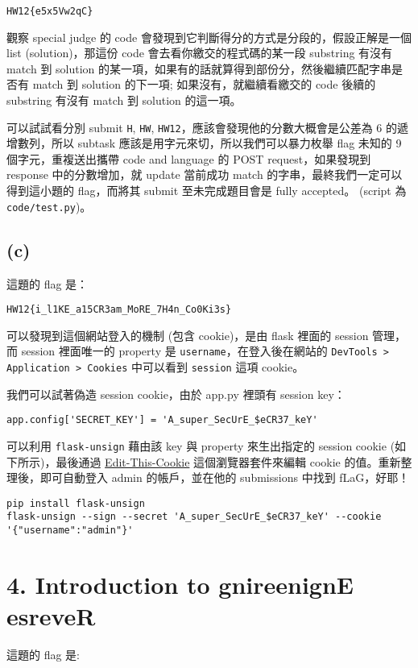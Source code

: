 \documentclass[12pt]{article}
\begin{document}
{\centering\verb|HW12{e5x5Vw2qC}|\par}

觀察 special judge 的 code 會發現到它判斷得分的方式是分段的，假設正解是一個 list (solution)，那這份 code 會去看你繳交的程式碼的某一段 substring 有沒有 match 到 solution 的某一項，如果有的話就算得到部份分，然後繼續匹配字串是否有 match 到 solution 的下一項; 如果沒有，就繼續看繳交的 code 後續的 substring 有沒有 match 到 solution 的這一項。

可以試試看分別 submit \verb|H|, \verb|HW|, \verb|HW12|，應該會發現他的分數大概會是公差為 6 的遞增數列，所以 subtask 應該是用字元來切，所以我們可以暴力枚舉 flag 未知的 9 個字元，重複送出攜帶 code and language 的 POST request，如果發現到 response 中的分數增加，就 update 當前成功 match 的字串，最終我們一定可以得到這小題的 flag，而將其 submit 至未完成題目會是 fully accepted。 (script 為 \verb|code/test.py|)。

\subsection*{(c)}
這題的 flag 是：

{\centering\verb|HW12{i_l1KE_a15CR3am_MoRE_7H4n_Co0Ki3s}|\par}

可以發現到這個網站登入的機制 (包含 cookie)，是由 flask 裡面的 session 管理，而 session 裡面唯一的 property 是 \verb|username|，在登入後在網站的 \verb|DevTools > Application > Cookies| 中可以看到 \verb|session| 這項 cookie。

我們可以試著偽造 session cookie，由於 app.py 裡頭有 session key：

{\centering\verb|app.config['SECRET_KEY'] = 'A_super_SecUrE_$eCR37_keY'|\par}

可以利用 \verb|flask-unsign| 藉由該 key 與 property 來生出指定的 session cookie (如下所示)，最後通過 
\href{https://github.com/ETCExtensions/Edit-This-Cookie}{Edit-This-Cookie} 這個瀏覽器套件來編輯 cookie 的值。重新整理後，即可自動登入 admin 的帳戶，並在他的 submissions 中找到 fLaG，好耶！
\begin{Verbatim}[breaklines]
pip install flask-unsign
flask-unsign --sign --secret 'A_super_SecUrE_$eCR37_keY' --cookie '{"username":"admin"}'
\end{Verbatim}

\section*{4. Introduction to gnireenignE esreveR}
這題的 flag 是:
\end{document}
